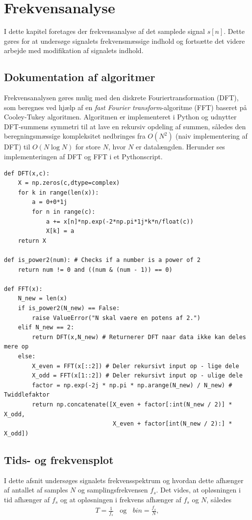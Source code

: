 \chapter{Frekvensanalyse}
I dette kapitel foretages der frekvensanalyse af det samplede signal $s[n]$. Dette gøres for at undersøge signalets frekvensmæssige indhold og fortsætte det videre arbejde med modifikation af signalets indhold.

\section{Dokumentation af algoritmer}
Frekvensanalysen gøres mulig med den diskrete Fouriertransformation (DFT), som beregnes ved hjælp af en \textit{fast Fourier transform}-algoritme (FFT) baseret på Cooley-Tukey algoritmen. Algoritmen er implementeret i Python og udnytter DFT-summens symmetri til at lave en rekursiv opdeling af summen, således den beregningsmæssige kompleksitet nedbringes fra $O(N^2)$ (naiv implementering af DFT) til $O(N\log N)$ for store $N$, hvor $N$ er datalængden. Herunder ses implementeringen af DFT og FFT i et Pythonscript.
\begin{lstlisting}
def DFT(x,c):
    X = np.zeros(c,dtype=complex)
    for k in range(len(x)):
        a = 0+0*1j
        for n in range(c):
            a += x[n]*np.exp(-2*np.pi*1j*k*n/float(c))
            X[k] = a
    return X

def is_power2(num): # Checks if a number is a power of 2
	return num != 0 and ((num & (num - 1)) == 0)

def FFT(x):
    N_new = len(x)
    if is_power2(N_new) == False:
        raise ValueError("N skal vaere en potens af 2.")
    elif N_new == 2:
        return DFT(x,N_new) # Returnerer DFT naar data ikke kan deles mere op
    else:
        X_even = FFT(x[::2]) # Deler rekursivt input op - lige dele
        X_odd = FFT(x[1::2]) # Deler rekursivt input op - ulige dele
        factor = np.exp(-2j * np.pi * np.arange(N_new) / N_new) # Twiddlefaktor
        return np.concatenate([X_even + factor[:int(N_new / 2)] * X_odd,
                               X_even + factor[int(N_new / 2):] * X_odd])
\end{lstlisting}

\section{Tids- og frekvensplot}
I dette afsnit undersøges signalets frekvensspektrum og hvordan dette afhænger af antallet af samples $N$ og samplingsfrekvensen $f_s$. Det vides, at opløsningen i tid afhænger af $f_s$ og at opløsningen i frekvens afhænger af $f_s$ og $N$, således
\begin{align} \label{eq:tidsoploesning}
T = \frac{1}{f_s}\phantom{m}\text{og}\phantom{m} bin=\frac{f_s}{N},
\end{align}

